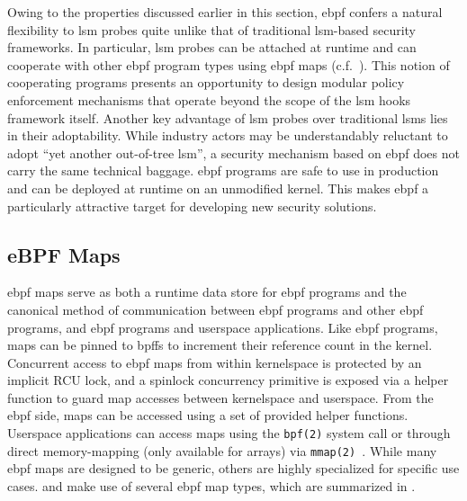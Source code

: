 Owing to the properties discussed earlier in this section, \gls{ebpf} confers a natural
flexibility to \gls{lsm} probes quite unlike that of traditional \gls{lsm}-based security
frameworks.  In particular, \gls{lsm} probes can be attached at runtime and can cooperate
with other \gls{ebpf} program types using \gls{ebpf} maps (c.f.~).
This notion of cooperating programs presents an opportunity to design modular policy
enforcement mechanisms that operate beyond the scope of the \gls{lsm} hooks framework
itself.  Another key advantage of \gls{lsm} probes over traditional \gls{lsm}s lies in
their adoptability.  While industry actors may be understandably reluctant to adopt
\enquote{yet another out-of-tree \gls{lsm}}, a security mechanism based on \gls{ebpf} does
not carry the same technical baggage.  \gls{ebpf} programs are safe to use in production
and can be deployed at runtime on an unmodified kernel.  This makes \gls{ebpf}
a particularly attractive target for developing new security solutions.

\subsection{eBPF Maps}%
\label{ss:bpf-maps-bg}

\gls{ebpf} maps serve as both a runtime data store for \gls{ebpf} programs and the
canonical method of communication between \gls{ebpf} programs and other \gls{ebpf}
programs, and \gls{ebpf} programs and userspace applications. Like \gls{ebpf} programs,
maps can be pinned to \gls{bpffs} to increment their reference count in the kernel.
Concurrent access to \gls{ebpf} maps from within kernelspace is protected by an implicit
RCU lock, and a spinlock concurrency primitive is exposed via a helper function to guard
map accesses between kernelspace and userspace.  From the \gls{ebpf} side, maps can be
accessed using a set of provided helper functions.  Userspace applications can access maps
using the \texttt{bpf(2)} system call or through direct memory-mapping (only available for
arrays) via \texttt{mmap(2)~\cite{gregg2019_bpf}}. While many \gls{ebpf} maps are designed
to be generic, others are highly specialized for specific use cases. \bpfcontain{} and
\bpfbox{} make use of several \gls{ebpf} map types, which are summarized in
.

